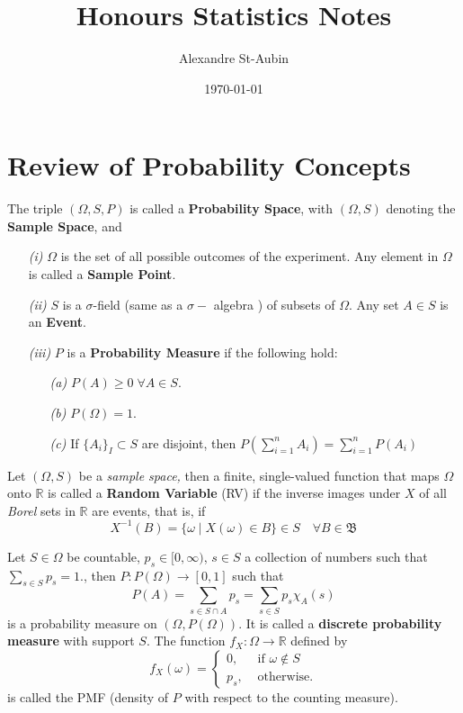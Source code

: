 \documentclass{tufte-handout}
\title{Honours Statistics Notes}
\date{\today}
\author{Alexandre St-Aubin}
\makeatletter
\renewcommand{\maketitlepage}{%
\begingroup%
\setlength{\parindent}{0pt}

{\fontsize{24}{24}\selectfont\textit{\@author}\par}

\vspace{1.75in}{\fontsize{36}{54}\selectfont\@title\par}

\vspace{0.5in}{\fontsize{14}{14}\selectfont\textsf{\smallcaps{\@date}}\par}

\vfill{\fontsize{14}{14}\selectfont\textit{\@publisher}\par}

\thispagestyle{empty}
\endgroup
\newpage
}
\makeatother
\begin{document}
\maketitlepage%

\tableofcontents
\newpage
\section{Review of Probability Concepts}%
  \label{sec:Review of Probability Concepts}
  \begin{definition}
  The triple $(\Omega, S, P)$ is called a \textbf{Probability Space}, with $(\Omega, S)$ denoting the \textbf{Sample Space}, and 
  \begin{enumerate}
    \item[\it (i)] $\Omega$ is the set of all possible outcomes of the experiment. Any element in $\Omega$ is called a \textbf{Sample Point}. 
    \item[\it (ii)] $S$ is a $\sigma$-field (same as a $\sigma-$ algebra ) of subsets of $\Omega$. Any set $A \in S$ is an \textbf{Event}. 
    \item[\it (iii)] $P$ is a \textbf{Probability Measure} if the following hold: 
    \begin{enumerate}
      \item[\it (a)] $P(A)\geq 0 \; \forall A \in S$. 
      \item[\it (b)] $P(\Omega) = 1.$
      \item[\it (c)] If $\{A_i\}_I \subset S$ are disjoint, then $P\left(\sum^{n}_{i=1} A_i\right) = \sum^{n}_{i=1} P(A_i)$ 
    \end{enumerate}
  \end{enumerate}
\end{definition}
\begin{definition}
  Let $(\Omega, S)$ be a \textit{sample space,} then a finite, single-valued function that maps $\Omega$ onto $\mathbb{R}$ is called a \textbf{Random Variable} (RV) if the inverse images under $X$ of all \textit{Borel} sets in $\mathbb{R}$ are events, that is, if 
  $$X^{-1}(B) = \{ \omega \mid X(\omega)\in B \} \in S \quad \forall B  \in \mathfrak{B} $$
\end{definition}
\begin{definition}
  Let $S \in \Omega$ be countable, $p_s \in [0, \infty)$, $s\in S$ a collection of numbers such that $\sum_{s \in S}p_s = 1. $, then $P: P(\Omega) \to [0,1]$ such that
  $$P(A) =\sum_{s\in S\cap A} p_s =   \sum_{s\in S} p_s \chi_A(s) $$
  is a probability measure on $(\Omega, P(\Omega))$. It is called a \textbf{discrete probability measure} with support $S$.
  The function $f_X: \Omega \to \mathbb{R}$ defined by 
  $$f_X(\omega) =  \begin{cases}
    0, &\text{ if } \omega \notin S \\ 
    p_s, &\text{ otherwise.} 
  \end{cases} $$
  is called the PMF (density of $P$ with respect to the counting measure).
\end{definition}
\end{document}
